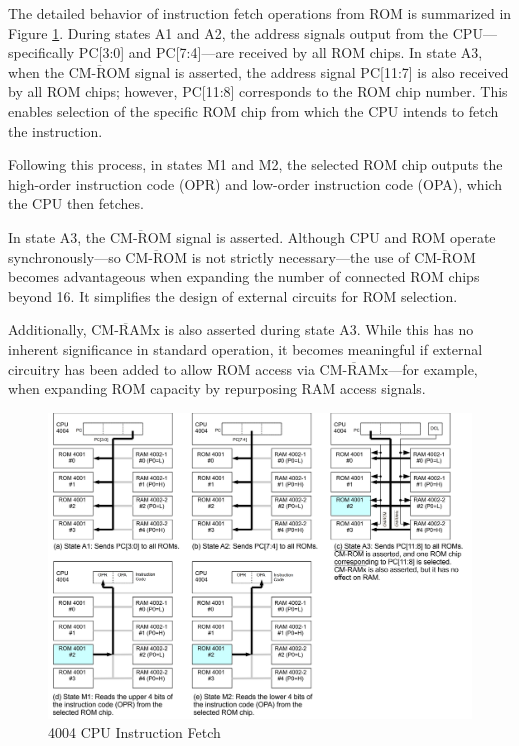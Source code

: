 The detailed behavior of instruction fetch operations from ROM is summarized in Figure \ref{fig:CPUINSTRUCTIONFETCH}. During states A1 and A2, the address signals output from the CPU—specifically PC[3:0] and PC[7:4]—are received by all ROM chips. In state A3, when the $\overline{\text{CM-ROM}}$ signal is asserted, the address signal PC[11:7] is also received by all ROM chips; however, PC[11:8] corresponds to the ROM chip number. This enables selection of the specific ROM chip from which the CPU intends to fetch the instruction.

Following this process, in states M1 and M2, the selected ROM chip outputs the high-order instruction code (OPR) and low-order instruction code (OPA), which the CPU then fetches.

In state A3, the $\overline{\text{CM-ROM}}$ signal is asserted. Although CPU and ROM operate synchronously—so $\overline{\text{CM-ROM}}$ is not strictly necessary—the use of $\overline{\text{CM-ROM}}$ becomes advantageous when expanding the number of connected ROM chips beyond 16. It simplifies the design of external circuits for ROM selection.

Additionally, $\overline{\text{CM-RAMx}}$ is also asserted during state A3. While this has no inherent significance in standard operation, it becomes meaningful if external circuitry has been added to allow ROM access via $\overline{\text{CM-RAMx}}$—for example, when expanding ROM capacity by repurposing RAM access signals.

\begin{figure}[htbp]
    \includegraphics[width=1.0\columnwidth]{./Figure/CPUInstructionFetch.png}
    \caption{4004 CPU Instruction Fetch}
    \label{fig:CPUINSTRUCTIONFETCH}
\end{figure}

